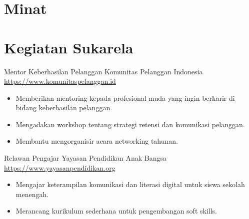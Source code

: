 \documentclass[a4paper, serif, 10pt]{moderncv}
\begin{document}
\section{Minat}

\section{Kegiatan Sukarela}

        {Mentor Keberhasilan Pelanggan}
        {Komunitas Pelanggan Indonesia}
        {\url{https://www.komunitaspelanggan.id}}
        {}
        {\begin{itemize}
\item Memberikan mentoring kepada profesional muda yang ingin berkarir di bidang keberhasilan pelanggan.
\item Mengadakan workshop tentang strategi retensi dan komunikasi pelanggan.
\item Membantu mengorganisir acara networking tahunan.
\end{itemize}}
    

        {Relawan Pengajar}
        {Yayasan Pendidikan Anak Bangsa}
        {\url{https://www.yayasanpendidikan.org}}
        {}
        {\begin{itemize}
\item Mengajar keterampilan komunikasi dan literasi digital untuk siswa sekolah menengah.
\item Merancang kurikulum sederhana untuk pengembangan soft skills.
\end{itemize}}
    
\end{document}
